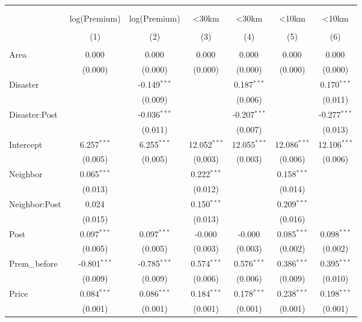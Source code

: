 
\begin{tabular}{@{\extracolsep{5pt}}lcccccc}
\\[-1.8ex]\hline
\hline \\[-1.8ex]
\\[-1.8ex] & \multicolumn{1}{c}{log(Premium)} & \multicolumn{1}{c}{log(Premium)} & \multicolumn{1}{c}{<30km} & \multicolumn{1}{c}{<30km} & \multicolumn{1}{c}{<10km} & \multicolumn{1}{c}{<10km}  \\
\\[-1.8ex] & (1) & (2) & (3) & (4) & (5) & (6) \\
\hline \\[-1.8ex]
 Area & 0.000$^{}$ & 0.000$^{}$ & 0.000$^{}$ & 0.000$^{}$ & 0.000$^{}$ & 0.000$^{}$ \\
& (0.000) & (0.000) & (0.000) & (0.000) & (0.000) & (0.000) \\
 Disaster & & -0.149$^{***}$ & & 0.187$^{***}$ & & 0.170$^{***}$ \\
& & (0.009) & & (0.006) & & (0.011) \\
 Disaster:Post & & -0.036$^{***}$ & & -0.207$^{***}$ & & -0.277$^{***}$ \\
& & (0.011) & & (0.007) & & (0.013) \\
 Intercept & 6.257$^{***}$ & 6.255$^{***}$ & 12.052$^{***}$ & 12.055$^{***}$ & 12.086$^{***}$ & 12.106$^{***}$ \\
& (0.005) & (0.005) & (0.003) & (0.003) & (0.006) & (0.006) \\
 Neighbor & 0.065$^{***}$ & & 0.222$^{***}$ & & 0.158$^{***}$ & \\
& (0.013) & & (0.012) & & (0.014) & \\
 Neighbor:Post & 0.024$^{}$ & & 0.150$^{***}$ & & 0.209$^{***}$ & \\
& (0.015) & & (0.013) & & (0.016) & \\
 Post & 0.097$^{***}$ & 0.097$^{***}$ & -0.000$^{}$ & -0.000$^{}$ & 0.085$^{***}$ & 0.098$^{***}$ \\
& (0.005) & (0.005) & (0.003) & (0.003) & (0.002) & (0.002) \\
 Prem\_before & -0.801$^{***}$ & -0.785$^{***}$ & 0.574$^{***}$ & 0.576$^{***}$ & 0.386$^{***}$ & 0.395$^{***}$ \\
& (0.009) & (0.009) & (0.006) & (0.006) & (0.009) & (0.010) \\
 Price & 0.084$^{***}$ & 0.086$^{***}$ & 0.184$^{***}$ & 0.178$^{***}$ & 0.238$^{***}$ & 0.198$^{***}$ \\
& (0.001) & (0.001) & (0.001) & (0.001) & (0.001) & (0.001) \\

\end{tabular}
